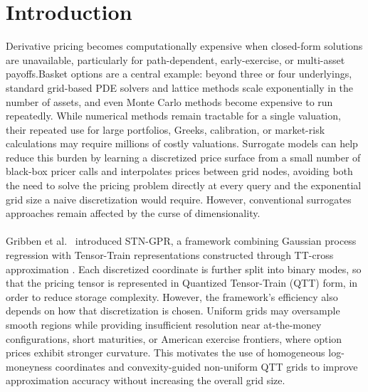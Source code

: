 \documentclass{article}
\numberwithin{equation}{subsection}
\theoremstyle{definition}
\theoremstyle{remark}
\begin{document}
\section{Introduction}
Derivative pricing becomes computationally expensive when closed-form solutions are unavailable, particularly for path-dependent, early-exercise, or multi-asset payoffs.Basket options are a central example: beyond three or four underlyings, standard grid-based PDE solvers and lattice methods scale exponentially in the number of assets, and even Monte Carlo methods become expensive to run repeatedly. While numerical methods remain tractable for a single valuation, their repeated use for large portfolios, Greeks, calibration, or market-risk calculations may require millions of costly valuations. Surrogate models can help reduce this burden by learning a discretized price surface from a small number of black-box pricer calls and interpolates prices between grid nodes, avoiding both the need to solve the pricing problem directly at every query and the exponential grid size a naive discretization would require.
However, conventional surrogates approaches remain affected by the curse of dimensionality.\\
\\
Gribben et al.\ \cite{Gribben2026STNGPR} introduced STN-GPR, a framework combining Gaussian process regression with Tensor-Train representations constructed through TT-cross approximation \cite{oseledets2010ttcross,oseledets2011tensorTrain}. Each discretized coordinate is further split into binary modes, so that the pricing tensor is represented in Quantized Tensor-Train (QTT) form, in order to reduce storage complexity. However, the framework's efficiency also depends on how that discretization is chosen. Uniform grids may oversample smooth regions while providing insufficient resolution near at-the-money configurations, short maturities, or American exercise frontiers, where option prices exhibit stronger curvature. This motivates the use of homogeneous log-moneyness coordinates and convexity-guided non-uniform QTT grids to improve approximation accuracy without increasing the overall grid size.\\
\end{document}
